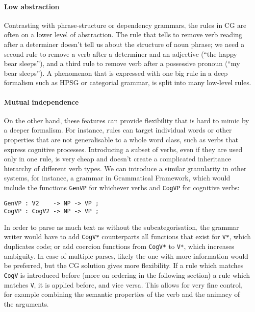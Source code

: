 \paragraph{Low abstraction}
Contrasting with phrase-structure or dependency grammars, the rules in
CG are often on a lower level of abstraction. 
The rule that tells to remove verb reading after a determiner
doesn't tell us about the structure of noun phrase; we need a second
rule to remove a verb after a determiner and an adjective (``the happy
bear sleeps''), and a third rule to remove verb after a possessive
pronoun (``my bear sleeps''). A phenomenon that is expressed with one
big rule in a deep formalism such as HPSG or categorial grammar, is
split into many low-level rules.

\paragraph{Mutual independence}
On the other hand, these features can provide
flexibility that is hard to mimic by a deeper formalism.
For instance, rules can target individual words
or other properties that are not generalisable to a whole word class,
such as verbs that express cognitive processes.
Introducing a subset of verbs, even if they are used only in one rule,
is very cheap and doesn't create a complicated inheritance hierarchy
of different verb types.
We can introduce a similar granularity in other systems, for instance,
a grammar in Grammatical Framework, which would include the functions
\texttt{GenVP} for whichever verbs and \texttt{CogVP} for cognitive verbs:


\begin{verbatim}
GenVP : V2    -> NP -> VP ;
CogVP : CogV2 -> NP -> VP ;
\end{verbatim}

In order to parse as much text as without the subcategorisation, the
grammar writer would have to add \texttt{CogV*} counterparts all
functions that exist for \texttt{V*}, which duplicates code; or add
coercion functions from  \texttt{CogV*} to \texttt{V*}, which increases ambiguity.
In case of multiple parses, likely the one with more information
would be preferred, but the CG solution gives more flexibility. If a
rule which matches \texttt{CogV} is introduced before (more on
ordering in the following section) a rule which matches \texttt{V}, it
is applied before, and vice versa. This allows for very fine control,
for example combining the semantic properties of the verb and the
animacy of the arguments.

